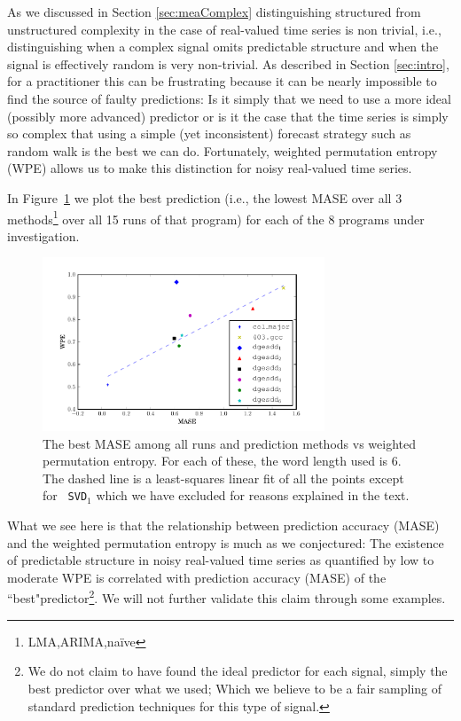 \documentclass{article}
\begin{document}

As we discussed in Section \ref{sec:meaComplex} distinguishing structured from unstructured complexity in the case of real-valued time series is non trivial, i.e., distinguishing when a complex signal omits predictable structure and when the signal is effectively random is very non-trivial. As described in Section \ref{sec:intro}, for a practitioner this can be frustrating because it can be nearly impossible to find the source of faulty predictions: Is it simply that we need to use a more ideal (possibly more advanced) predictor or is it the case that the time series is simply so complex that using a simple (yet inconsistent) forecast strategy such as random walk is the best we can do. Fortunately, weighted permutation entropy (WPE) allows us to make this distinction for noisy real-valued time series. 

In Figure~\ref{fig:pred_vs_wpe} we plot the best prediction (i.e., the lowest MASE over all 3 methods\footnote{LMA,ARIMA,na\"ive} over all 15 runs of that program) for each of the 8 programs under investigation. 
\begin{figure}[htbp]
  \centering
  \includegraphics[width=0.75\textwidth]{figs/prediction_vs_entropy}
  \caption{The best MASE among all runs and prediction methods vs weighted
  permutation entropy. For each of these, the word length used is $6$. The
  dashed line is a least-squares linear fit of all the points except for {\tt
  SVD$_1$} which we have excluded for reasons explained in the text.}
  \label{fig:pred_vs_wpe}
\end{figure}
What we see here is that the relationship between prediction accuracy (MASE) and the weighted permutation entropy is much as we conjectured: The existence of predictable structure in noisy real-valued time series as quantified by low to moderate WPE  is correlated with prediction accuracy (MASE) of the ``best"predictor\footnote{We do not claim to have found the ideal predictor for each signal, simply the best predictor over what we used; Which we believe to be a fair sampling of standard prediction techniques for this type of signal.}. We will not further validate this claim through some examples. 
\end{document}
